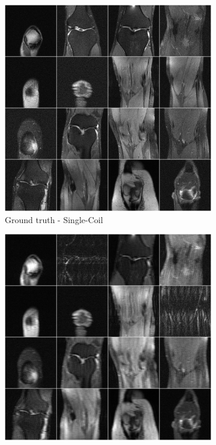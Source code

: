 \documentclass{article}
\begin{document}
\begin{figure}[H] 
\centering
   \begin{subfigure}[]{.5\textwidth}
   \centering
        \includegraphics[width=.95\linewidth]{target}
	\caption{Ground truth  - Single-Coil }
	\vspace*{2mm} 
    \end{subfigure}%
   \begin{subfigure}[]{.5\textwidth}
   \centering
        \includegraphics[width=.95\linewidth]{undersampled}

\end{subfigure}
\end{figure}
\end{document}
